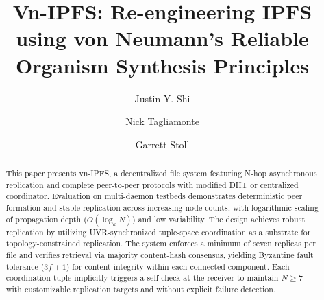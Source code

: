\documentclass[runningheads]{llncs}
\begin{document}
%
\title{Vn-IPFS: Re-engineering IPFS using von Neumann's Reliable Organism Synthesis Principles}
%
%
\author{Justin Y. Shi 
\and
Nick Tagliamonte 
\and
Garrett Stoll 
}
%
%

\maketitle              %
%
\begin{abstract}
    This paper presents vn-IPFS, a decentralized file system featuring N-hop asynchronous replication and complete peer-to-peer protocols with modified DHT or centralized coordinator. Evaluation on multi-daemon testbeds demonstrates deterministic peer formation and stable replication across increasing node counts, with logarithmic scaling of propagation depth ($O(\log_k N)$) and low variability. The design achieves robust replication by utilizing UVR-synchronized tuple-space coordination as a substrate for topology-constrained replication. The system enforces a minimum of seven replicas per file and verifies retrieval via majority content-hash consensus, yielding Byzantine fault tolerance ($3f+1$) for content integrity within each connected component. Each coordination tuple implicitly triggers a self-check at the receiver to maintain \(N\ge 7\) with customizable replication targets and without explicit failure detection.
\end{abstract}
%
%
%
\end{document}
